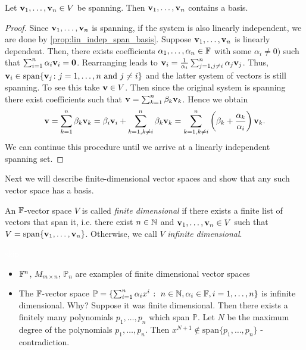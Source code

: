 \documentclass{article}
\begin{document}
\begin{proposition}\label{prop:span_cont_basis}
 Let ${\mathbf{v}}_1,\ldots, {\mathbf{v}}_n\in V$ be spanning. Then ${\mathbf{v}}_1,\ldots, {\mathbf{v}}_n$ contains a basis.
\end{proposition}

\begin{proof}
Since ${\mathbf{v}}_1,\ldots, {\mathbf{v}}_n$ is spanning, if the system is also linearly independent, we are done by \cref{prop:lin_indep_span_basis}. Suppose ${\mathbf{v}}_1,\ldots, {\mathbf{v}}_n$ is linearly dependent. Then, there exists coefficients $\alpha_1,\ldots,\alpha_n\in {\mathbb{F}}$ with some $\alpha_i\neq 0)$ such that $\sum_{i=1}^n \alpha_i {\mathbf{v}}_i = {\mathbf{0}}$. Rearranging leads to ${\mathbf{v}}_i = \frac{1}{\alpha_i} \sum_{j=1,j\neq i}^n \alpha_j {\mathbf{v}}_j$. Thus, ${\mathbf{v}}_i \in \mathrm{span}\{{\mathbf{v}}_j \colon j=1,\ldots,n \text{ and } j\neq i\}$ and the latter system of vectors is still spanning. To see this take ${\mathbf{v}} \in V$. Then since the original system is spanning there exist coefficients such that ${\mathbf{v}} = \sum_{k= 1}^n \beta_k {\mathbf{v}}_k$. Hence we obtain 
$${\mathbf{v}} = \sum_{k= 1}^n \beta_k {\mathbf{v}}_k = \beta_i {\mathbf{v}}_i + \sum_{k = 1, k\neq i}^n \beta_k {\mathbf{v}}_k = \sum_{k = 1, k\neq i}^n \left(\beta_k +\frac{\alpha_k}{\alpha_i} \right){\mathbf{v}}_k.$$ 
We can continue this procedure until we arrive at a linearly independent spanning set. 
\end{proof}

Next we will describe finite-dimensional vector spaces and show that any such vector space has a basis.

\begin{definition}
An ${\mathbb{F}}$-vector space $V$ is called \emph{finite dimensional} if there exists a finite list of vectors that span it, i.e. there exist $n\in {\mathbb{N}}$ and ${\mathbf{v}}_1,\ldots, {\mathbf{v}}_n\in V$ such that $V= \mathrm{span}\{{\mathbf{v}}_1,\ldots,{\mathbf{v}}_n\}$. Otherwise, we call $V$ \emph{infinite dimensional}.
\end{definition}

\begin{example}
\textcolor{white}{skip}
\begin{itemize}
    \item ${\mathbb{F}}^n$, $M_{m\times n}$, $\mathbb{P}_n$ are examples of finite dimensional vector spaces
    \item The ${\mathbb{F}}$-vector space $\mathbb{P} = \{ \sum_{i=1}^n \alpha_i x^i  \; \colon \; n\in {\mathbb{N}}, \alpha_i \in {\mathbb{F}}, i=1,\ldots,n\}$ is infinite dimensional. Why? Suppose it was finite dimensional. Then there exists a finitely many polynomials $p_1,\ldots, p_n$ which span $\mathbb{P}$. Let $N$ be the maximum degree of the polynomials $p_1,\ldots, p_n$. Then $x^{N+1} \not\in \mathrm{span}\{p_1,\ldots,p_n\}$ - contradiction.
\end{itemize}
\end{example}
\end{document}
